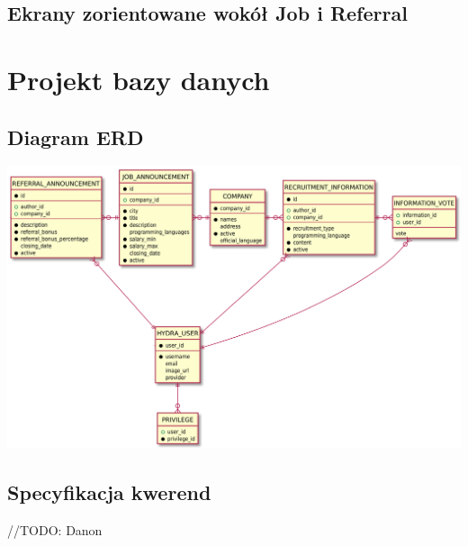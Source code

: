 \documentclass{scrreprt}
\begin{document}
\section{Ekrany zorientowane wokół Job i Referral}
\begin{center}
\end{center}


\chapter{Projekt bazy danych}

\section{Diagram ERD}
\includegraphics[width=\textwidth, keepaspectratio]{graphics/hydra_db_erd.pdf}

\section{Specyfikacja kwerend}
//TODO: Danon
\end{document}
